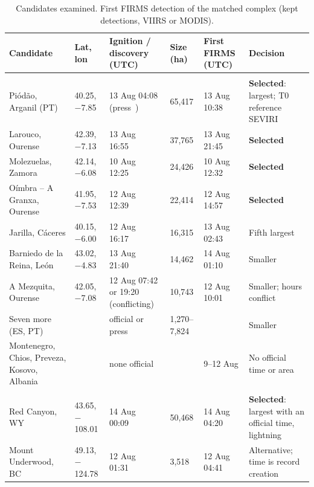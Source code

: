 \documentclass[11pt]{article}
\begin{document}
\begin{longtable}{|p{2.6cm}|p{1.9cm}|p{2.6cm}|p{1.3cm}|p{1.9cm}|p{3.6cm}|}
\caption{Candidates examined. First FIRMS detection of the matched complex (kept detections, VIIRS or MODIS).}\label{tab:candidates}\\
\hline
\rowcolor{tablehead}
\textbf{Candidate} & \textbf{Lat, lon} & \textbf{Ignition / discovery (UTC)} & \textbf{Size (ha)} & \textbf{First FIRMS (UTC)} & \textbf{Decision} \\
\hline
\endhead
\rowcolor{tablegroup}
\multicolumn{6}{|l|}{\textit{Europe (official area from EGIF~\cite{miteco2025avance} or ICNF~\cite{icnf2025relatorio8})}} \\
\hline
Pi\'od\~ao, Arganil (PT) & 40.25, $-$7.85 & 13 Aug 04:08 (press~\cite{sabado2025piodao}) & 65,417 & 13 Aug 10:38 & \textbf{Selected}: largest; T0 reference SEVIRI \\
\hline
Larouco, Ourense & 42.39, $-$7.13 & 13 Aug 16:55~\cite{xunta2025larouco} & 37,765 & 13 Aug 21:45 & \textbf{Selected} \\
\hline
Molezuelas, Zamora & 42.14, $-$6.08 & 10 Aug 12:25~\cite{jcyl2025incendios} & 24,426 & 10 Aug 12:32 & \textbf{Selected} \\
\hline
O\'imbra -- A Granxa, Ourense & 41.95, $-$7.53 & 12 Aug 12:39~\cite{xunta2025oimbra} & 22,414 & 12 Aug 14:57 & \textbf{Selected} \\
\hline
Jarilla, C\'aceres & 40.15, $-$6.00 & 12 Aug 16:17~\cite{doe2025jarilla} & 16,315 & 13 Aug 02:43 & Fifth largest \\
\hline
Barniedo de la Reina, Le\'on & 43.02, $-$4.83 & 13 Aug 21:40~\cite{jcyl2025incendios} & 14,462 & 14 Aug 01:10 & Smaller \\
\hline
A Mezquita, Ourense & 42.05, $-$7.08 & 12 Aug 07:42 or 19:20 (conflicting) & 10,743 & 12 Aug 10:01 & Smaller; hours conflict \\
\hline
Seven more (ES, PT) & & official or press & 1,270--7,824 & & Smaller \\
\hline
Montenegro, Chios, Preveza, Kosovo, Albania & & none official & & 9--12 Aug & No official time or area \\
\hline
\rowcolor{tablegroup}
\multicolumn{6}{|l|}{\textit{North America}} \\
\hline
Red Canyon, WY & 43.65, $-$108.01 & 14 Aug 00:09~\cite{nifc2025wfigs} & 50,468 & 14 Aug 04:20 & \textbf{Selected}: largest with an official time, lightning \\
\hline
Mount Underwood, BC & 49.13, $-$124.78 & 12 Aug 01:31~\cite{bcws2025underwood} & 3,518 & 12 Aug 04:41 & Alternative; time is record creation \\

\end{longtable}
\end{document}
